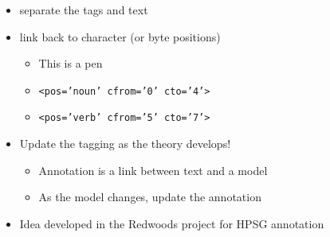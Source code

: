 \documentclass[a4paper,landscape,headrule,footrule,dvips]{foils}
\begin{document}
\begin{CJK}{UTF8}{min}









\begin{itemize}
\item separate the tags and text
\item link back to character (or byte positions)
  \begin{itemize}
  \item This is a pen
  \item \texttt{<pos='noun' cfrom='0'  cto='4'>}
  \item \texttt{<pos='verb' cfrom='5'  cto='7'>}
    
  \end{itemize}
\end{itemize}


\begin{itemize}
\item Update the tagging as the theory develops!
  \begin{itemize}
  \item Annotation is a link between text and a model
  \item As the model changes, update the annotation
  \end{itemize}
\item Idea developed in the Redwoods project for HPSG annotation
\end{itemize}


\end{CJK}
\end{document}
